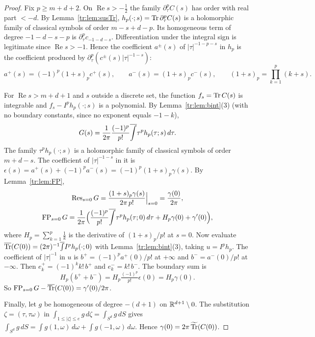 \begin{proof}
Fix \(p\ge m+d+2\). On \(\operatorname{Re}s>-\frac12\) the family
\(\partial_\tau^pC(s)\) has order with real part \(<-d\). By
Lemma~\ref{tr:lem:susTr}, \(h_p(\cdot;s)=\operatorname{Tr}\partial_\tau^pC(s)\) is a
holomorphic family of classical symbols of order \(m-s+d-p\). Its
homogeneous term of degree \(-1-d-s-p\) is \(\partial_\tau^pc_{-1-d-s}\).
Differentiation under the integral sign is legitimate since
\(\operatorname{Re}s>-1\). Hence the coefficient \(a^\pm(s)\) of
\(|\tau|^{-1-p-s}\) in \(h_p\) is the coefficient produced by
\(\partial_\tau^p(c^\pm(s)|\tau|^{-1-s})\):
\[
 a^+(s)=(-1)^p(1+s)_pc^+(s),\qquad a^-(s)=(1+s)_pc^-(s),\qquad
 (1+s)_p=\prod_{k=1}^p(k+s).
\]

For \(\operatorname{Re}s>m+d+1\) and \(s\) outside a discrete set, the
function \(f_s=\operatorname{Tr} C(s)\) is integrable and \(f_s-I^ph_p(\cdot;s)\) is a
polynomial. By Lemma~\ref{tr:lem:bint}(3) (with no boundary constants,
since no exponent equals \(-1-k\)),
\[
 G(s)=\frac1{2\pi}\frac{(-1)^p}{p!}\overline{\int}\tau^ph_p(\tau;s)\,d\tau .
\]
The family \(\tau^ph_p(\cdot;s)\) is a holomorphic family of classical
symbols of order \(m+d-s\). The coefficient of \(|\tau|^{-1-s}\) in it is
\(\epsilon(s)=a^+(s)+(-1)^pa^-(s)=(-1)^p(1+s)_p\gamma(s)\). By
Lemma~\ref{tr:lem:FP},
\begin{gather*}
 \operatorname{Res}_{s=0}G=\frac{(1+s)_p\gamma(s)}{2\pi\,p!}\Big|_{s=0}=\frac{\gamma(0)}{2\pi},\\
 \operatorname{FP}_{s=0}G=\frac1{2\pi}\Bigl(\frac{(-1)^p}{p!}\overline{\int}\tau^ph_p(\tau;0)\,d\tau
 +H_p\gamma(0)+\gamma'(0)\Bigr),
\end{gather*}
where \(H_p=\sum_{k=1}^p\frac1k\) is the derivative of \((1+s)_p/p!\) at
\(s=0\). Now evaluate \(\overline{\operatorname{Tr}}(C(0))=(2\pi)^{-1}\overline{\int} I^ph_p(\cdot;0)\) with
Lemma~\ref{tr:lem:bint}(3), taking \(u=I^ph_p\). The coefficient of
\(|\tau|^{-1}\) in \(u\) is \(b^+=(-1)^pa^+(0)/p!\) at \(+\infty\) and
\(b^-=a^-(0)/p!\) at \(-\infty\). Then \(e^+_k=(-1)^kk!\,b^+\) and
\(e^-_k=k!\,b^-\). The boundary sum is
\[
 H_p(b^++b^-)=H_p\tfrac{(-1)^p}{p!}\epsilon(0)=H_p\gamma(0).
\]
So
\(\operatorname{FP}_{s=0}G-\overline{\operatorname{Tr}}(C(0))=\gamma'(0)/2\pi\).

Finally, let \(g\) be homogeneous of degree \(-(d+1)\) on
\(\mathbb R^{d+1}\setminus0\). The substitution \(\zeta=(\tau,\tau\omega)\) in
\(\int_{1\le|\zeta|\le e}g\,d\zeta=\int_{S^d}g\,dS\) gives
\(\int_{S^d}g\,dS=\int g(1,\omega)\,d\omega+\int g(-1,\omega)\,d\omega\).
Hence \(\gamma(0)=2\pi\,\widetilde{\operatorname{Tr}}(C(0))\).
\end{proof}

